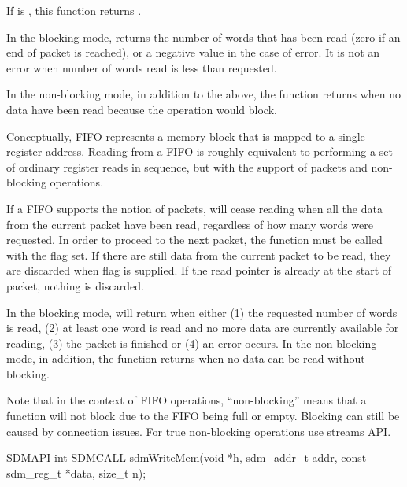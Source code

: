 \documentclass[a4paper,12pt,twoside,extrafontsizes]{memoir}
\begin{document}
\begin{funcret}
	If  is , this function returns .
	
	In the blocking mode, returns the number of words that has been read (zero if an end of packet is reached), or a negative value in the case of error. It is not an error when number of words read is less than requested.
	
	In the non-blocking mode, in addition to the above, the function returns  when no data have been read because the operation would block.
\end{funcret}

\begin{funcremarks}
	Conceptually, FIFO represents a memory block that is mapped to a single register address. Reading from a FIFO is roughly equivalent to performing a set of ordinary register reads in sequence, but with the support of packets and non-blocking operations.

	If a FIFO supports the notion of packets,  will cease reading when all the data from the current packet have been read, regardless of how many words were requested. In order to proceed to the next packet, the function must be called with the  flag set. If there are still data from the current packet to be read, they are discarded when  flag is supplied. If the read pointer is already at the start of packet, nothing is discarded.

	In the blocking mode,  will return when either (1) the requested number of words is read, (2) at least one word is read and no more data are currently available for reading, (3) the packet is finished or (4) an error occurs. In the non-blocking mode, in addition, the function returns when no data can be read without blocking.

	Note that in the context of FIFO operations, ``non-blocking'' means that a function will not block due to the FIFO being full or empty. Blocking can still be caused by connection issues. For true non-blocking operations use streams API.
\end{funcremarks}



\begin{cfuncprototype}
SDMAPI int SDMCALL sdmWriteMem(void *h, sdm_addr_t addr, const sdm_reg_t *data, size_t n);
\end{cfuncprototype}
\end{document}
